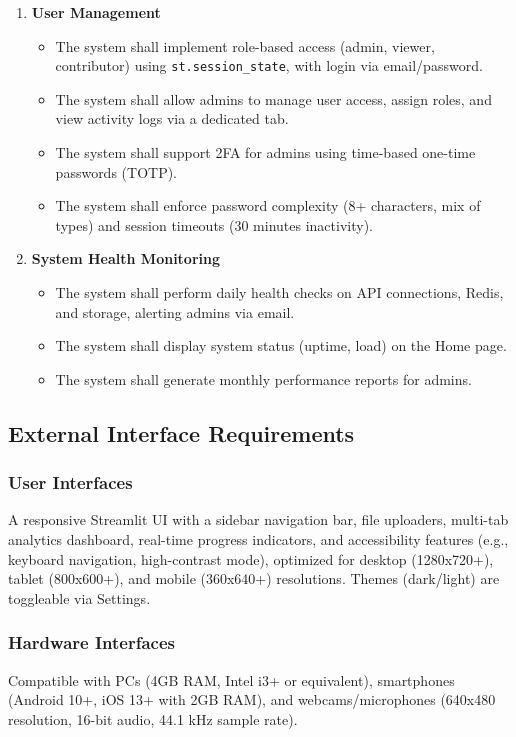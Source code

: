 \documentclass[12pt]{article}
\begin{document}
\begin{enumerate}
\begin{itemize}
    \end{itemize}
    \item \textbf{User Management}
    \begin{itemize}
        \item The system shall implement role-based access (admin, viewer, contributor) using \texttt{st.session_state}, with login via email/password.
        \item The system shall allow admins to manage user access, assign roles, and view activity logs via a dedicated tab.
        \item The system shall support 2FA for admins using time-based one-time passwords (TOTP).
        \item The system shall enforce password complexity (8+ characters, mix of types) and session timeouts (30 minutes inactivity).
    \end{itemize}
    \item \textbf{System Health Monitoring}
    \begin{itemize}
        \item The system shall perform daily health checks on API connections, Redis, and storage, alerting admins via email.
        \item The system shall display system status (uptime, load) on the Home page.
        \item The system shall generate monthly performance reports for admins.
    \end{itemize}
\end{enumerate}

\subsection{External Interface Requirements}
\subsubsection{User Interfaces}
A responsive Streamlit UI with a sidebar navigation bar, file uploaders, multi-tab analytics dashboard, real-time progress indicators, and accessibility features (e.g., keyboard navigation, high-contrast mode), optimized for desktop (1280x720+), tablet (800x600+), and mobile (360x640+) resolutions. Themes (dark/light) are toggleable via Settings.

\subsubsection{Hardware Interfaces}
Compatible with PCs (4GB RAM, Intel i3+ or equivalent), smartphones (Android 10+, iOS 13+ with 2GB RAM), and webcams/microphones (640x480 resolution, 16-bit audio, 44.1 kHz sample rate).
\end{document}
